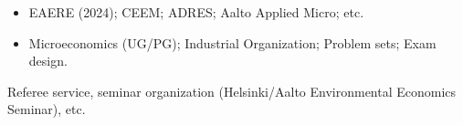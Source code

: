 \documentclass[11pt,a4paper]{article}
\begin{document}
\begin{itemize}
  \item EAERE (2024); CEEM; ADRES; Aalto Applied Micro; etc.
\end{itemize}

\begin{itemize}
  \item Microeconomics (UG/PG); Industrial Organization; Problem sets; Exam design.
\end{itemize}


Referee service, seminar organization (Helsinki/Aalto Environmental Economics Seminar), etc.
\end{document}
